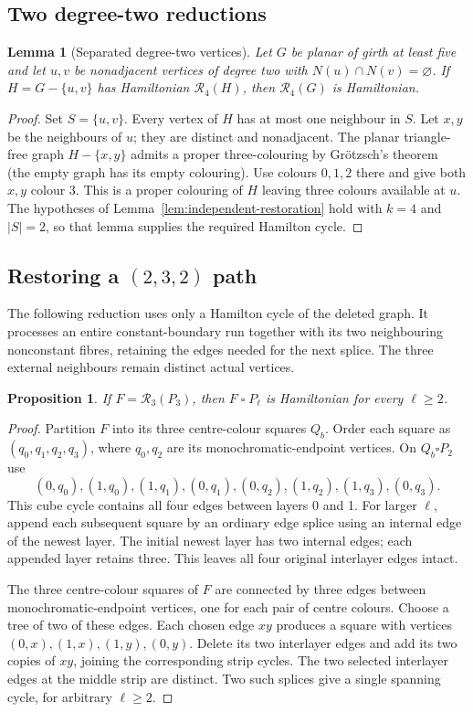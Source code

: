 \documentclass[11pt]{article}
\newtheorem{lemma}[theorem]{Lemma}
\newtheorem{proposition}[theorem]{Proposition}
\theoremstyle{remark}
\newcommand{\R}{\mathcal R}
\numberwithin{equation}{section}
\begin{document}
\subsection{Two degree-two reductions}
\begin{lemma}[Separated degree-two vertices]\label{lem:separated-two-g5}
Let $G$ be planar of girth at least five and let $u,v$ be nonadjacent
vertices of degree two with $N(u)\cap N(v)=\varnothing$.  If
$H=G-\{u,v\}$ has Hamiltonian $\R_4(H)$, then $\R_4(G)$ is Hamiltonian.
\end{lemma}
\begin{proof}
Set $S=\{u,v\}$.  Every vertex of $H$ has at most one neighbour in $S$.
Let $x,y$ be the neighbours of $u$; they are distinct and nonadjacent.
The planar triangle-free graph $H-\{x,y\}$ admits a proper three-colouring
by Gr\"otzsch's theorem~\cite{Grotzsch59} (the empty graph has its empty
colouring).  Use colours $0,1,2$ there and give both $x,y$ colour $3$.
This is a proper colouring of $H$ leaving three colours available at $u$.
The hypotheses of Lemma~\ref{lem:independent-restoration} hold with
$k=4$ and $|S|=2$, so that lemma supplies the required Hamilton cycle.
\end{proof}

\subsection{\texorpdfstring{Restoring a $(2,3,2)$ path}{Restoring a (2,3,2) path}}
The following reduction uses only a Hamilton cycle of the deleted graph.
It processes an entire constant-boundary run together with its two
neighbouring nonconstant fibres, retaining the edges needed for the next
splice.  The three external neighbours remain distinct actual vertices.
\begin{proposition}\label{prop:badrun}
If $F=\R_3(P_3)$, then $F\mathbin{\square}P_\ell$ is Hamiltonian
for every $\ell\ge2$.
\end{proposition}
\begin{proof}
Partition $F$ into its three centre-colour squares $Q_b$.
Order each square as $(q_0,q_1,q_2,q_3)$, where $q_0,q_2$ are
its monochromatic-endpoint vertices. On $Q_b\square P_2$ use
\[
 (0,q_0),(1,q_0),(1,q_1),(0,q_1),
 (0,q_2),(1,q_2),(1,q_3),(0,q_3).
\]
This cube cycle contains all four edges between layers 0 and 1.
For larger $\ell$, append each subsequent square by an ordinary
edge splice using an internal edge of the newest layer. The initial
newest layer has two internal edges; each appended layer retains
three. This leaves all four original interlayer edges intact.

The three centre-colour squares of $F$ are connected by three edges
between monochromatic-endpoint vertices, one for each pair of
centre colours. Choose a tree of two of these edges. Each chosen
edge $xy$ produces a square with vertices $(0,x),(1,x),(1,y),(0,y)$.
Delete its two interlayer edges and add its two copies of $xy$,
joining the corresponding strip cycles. The two selected interlayer
edges at the middle strip are distinct. Two such splices give a
single spanning cycle, for arbitrary $\ell\ge2$.
\end{proof}
\end{document}
